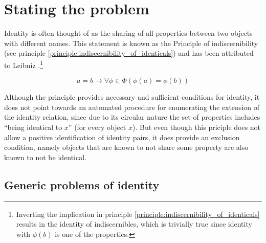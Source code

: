 \section{Stating the problem}
\label{sec:stating_the_problem}

Identity is often thought of as the sharing of all properties between
  two objects with different names. 
This statement is known as the Principle of indiscernibility
  (see principle \ref{principle:indiscernibility_of_identicals})
  and has been attributed to Leibniz \cite{Forrest2010}.\footnote{
    Inverting the implication in
      principle \ref{principle:indiscernibility_of_identicals}
      results in the identity of indiscernibles,
      which is trivially true since identity with $\phi(b)$
      is one of the properties.
    }

\begin{principle}
\label{principle:indiscernibility_of_identicals}
\begin{equation}
    a = b
  \rightarrow
    \forall \phi \in \Phi (\phi(a) = \phi(b)\nonumber)
\end{equation}
\end{principle}

\noindent Although the principle provides necessary and sufficient conditions
  for identity, it does not point towards an automated procedure
  for enumerating the extension of the identity relation,
  since due to its circular nature the set of properties includes
  ``being identical to $x$'' (for every object $x$).
But even though this priciple does not
  allow a positive identification of identity pairs,
  it does provide an exclusion condition,
  namely objects that are known to not share some property
  are also known to not be identical.

\subsection{Generic problems of identity}

